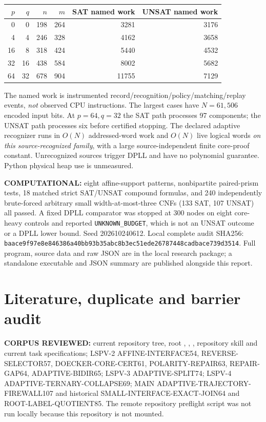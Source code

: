 \documentclass[11pt]{article}
\begin{document}
\begin{center}\small
\begin{tabular}{rrrrrr}
\toprule
$p$&$q$&$n$&$m$&SAT named work&UNSAT named work\\\midrule
0&0&198&264&3281&3176\\
4&4&246&328&4162&3658\\
16&8&318&424&5440&4532\\
32&16&438&584&8002&5682\\
64&32&678&904&11755&7129\\\bottomrule
\end{tabular}
\end{center}
The named work is instrumented record/recognition/policy/matching/replay events, \emph{not} observed CPU instructions. The largest cases have $N=61{,}506$ encoded input bits. At $p=64,q=32$ the SAT path processes 97 components; the UNSAT path processes six before certified stopping. The declared adaptive recognizer runs in $O(N)$ addressed-word work and $O(N)$ live logical words \emph{on this source-recognized family}, with a large source-independent finite core-proof constant. Unrecognized sources trigger DPLL and have no polynomial guarantee. Python physical heap use is unmeasured.

\textbf{COMPUTATIONAL:} eight affine-support patterns, nonbipartite paired-prism tests, 18 matched strict SAT/UNSAT compound formulas, and 240 independently brute-forced arbitrary small width-at-most-three CNFs (133 SAT, 107 UNSAT) all passed. A fixed DPLL comparator was stopped at 300 nodes on eight core-heavy controls and reported \texttt{UNKNOWN\_BUDGET}, which is not an UNSAT outcome or a DPLL lower bound. Seed 202610240612. Local complete audit SHA256:
\texttt{baace9f97e8e846386a40bb93b35abc8b3ec51ede26787448cadbace739d3514}.
Full program, source data and raw JSON are in the local research package; a standalone executable and JSON summary are published alongside this report.

\section{Literature, duplicate and barrier audit}
\textbf{CORPUS REVIEWED:} current repository tree, root , , , repository skill and current task specifications; LSPV-2 AFFINE-INTERFACE54, REVERSE-SELECTOR57, DOECKER-CORE-CERT61, POLARITY-REPAIR63, REPAIR-GAP64, ADAPTIVE-BIDIR65; LSPV-3 ADAPTIVE-SPLIT74; LSPV-4 ADAPTIVE-TERNARY-COLLAPSE69; MAIN ADAPTIVE-TRAJECTORY-FIREWALL107 and historical SMALL-INTERFACE-EXACT-JOIN64 and ROOT-LABEL-QUOTIENT85. The remote repository preflight script was not run locally because this repository is not mounted.
\end{document}
